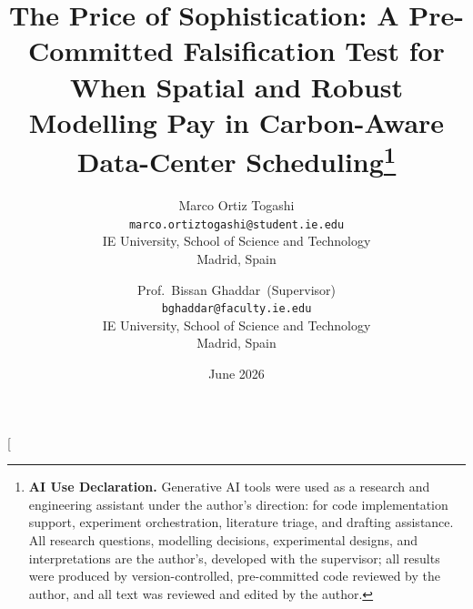 \documentclass[10pt,twocolumn]{article}
\begin{document}
\title{\vspace{-2.2em}\bfseries The Price of Sophistication: A Pre-Committed Falsification Test for When Spatial and Robust Modelling Pay in Carbon-Aware Data-Center Scheduling\thanks{\textbf{AI Use Declaration.} Generative AI tools were used as a research and engineering assistant under the author's direction: for code implementation support, experiment orchestration, literature triage, and drafting assistance. All research questions, modelling decisions, experimental designs, and interpretations are the author's, developed with the supervisor; all results were produced by version-controlled, pre-committed code reviewed by the author, and all text was reviewed and edited by the author.}}
\author{%
  Marco Ortiz Togashi\\
  \normalsize\texttt{marco.ortiztogashi@student.ie.edu}\\
  \normalsize IE University, School of Science and Technology\\
  \normalsize Madrid, Spain
  \and
  Prof.\ Bissan Ghaddar~(Supervisor)\\
  \normalsize\texttt{bghaddar@faculty.ie.edu}\\
  \normalsize IE University, School of Science and Technology\\
  \normalsize Madrid, Spain}
\date{June 2026}
\twocolumn[
\end{document}
